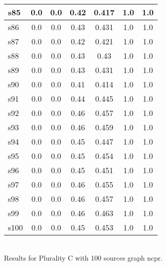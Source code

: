 \documentclass{article}
\begin{document}
\begin{tabular}{|l|c|c|c|c|c|c|}
\hline
s85 &0.0 & 0.0 & 0.42 & 0.417 & 1.0 & 1.0\\
\hline
s86 &0.0 & 0.0 & 0.43 & 0.431 & 1.0 & 1.0\\
\hline
s87 &0.0 & 0.0 & 0.42 & 0.421 & 1.0 & 1.0\\
\hline
s88 &0.0 & 0.0 & 0.43 & 0.43 & 1.0 & 1.0\\
\hline
s89 &0.0 & 0.0 & 0.43 & 0.431 & 1.0 & 1.0\\
\hline
s90 &0.0 & 0.0 & 0.41 & 0.414 & 1.0 & 1.0\\
\hline
s91 &0.0 & 0.0 & 0.44 & 0.445 & 1.0 & 1.0\\
\hline
s92 &0.0 & 0.0 & 0.46 & 0.457 & 1.0 & 1.0\\
\hline
s93 &0.0 & 0.0 & 0.46 & 0.459 & 1.0 & 1.0\\
\hline
s94 &0.0 & 0.0 & 0.45 & 0.447 & 1.0 & 1.0\\
\hline
s95 &0.0 & 0.0 & 0.45 & 0.454 & 1.0 & 1.0\\
\hline
s96 &0.0 & 0.0 & 0.45 & 0.451 & 1.0 & 1.0\\
\hline
s97 &0.0 & 0.0 & 0.46 & 0.455 & 1.0 & 1.0\\
\hline
s98 &0.0 & 0.0 & 0.46 & 0.457 & 1.0 & 1.0\\
\hline
s99 &0.0 & 0.0 & 0.46 & 0.463 & 1.0 & 1.0\\
\hline
s100 &0.0 & 0.0 & 0.45 & 0.453 & 1.0 & 1.0\\
\hline
\end{tabular}\\

\noindent Results for Plurality C with 100 sources graph ncpr.
\end{document}
